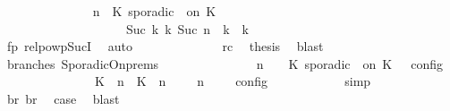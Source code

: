 \begin{isabellebody}
\ \ \ \ \ \ \ \ \ \ \ \ \isamarkupfalse%
\ {\isacartoucheopen}{\isacharparenleft}{\isasymGamma}{\isacharcomma}\ n\ {\isasymturnstile}\ {\isacharparenleft}K\ sporadic\ {\isasymtau}\ on\ K\ {\isacharhash}\ {\isasymPsi}\ {\isasymtriangleright}\ {\isasymPhi}{\isacharparenright}\isanewline
\ \ \ \ \ \ \ \ \ \ \ \ \ \ \ \ \ \ \ \ {\isasymhookrightarrow}\isactrlbsup Suc\ k\isactrlesup \ {\isacharparenleft}{\isasymGamma}\isactrlsub k{\isacharcomma}\ Suc\ n\ {\isasymturnstile}\ {\isasymPsi}\isactrlsub k\ {\isasymtriangleright}\ {\isasymPhi}\isactrlsub k{\isacharparenright}{\isacartoucheclose}\isanewline
\ \ \ \ \ \ \ \ \ \ \ \ \ \ \ \ \isamarkupfalse%
\ fp\ relpowp{\isacharunderscore}Suc{\isacharunderscore}I{}\ \isamarkupfalse%
\ auto\isanewline
\ \ \ \ \ \ \ \ \ \ \ \ \isamarkupfalse%
\ rc\ \isamarkupfalse%
\ {\isacharquery}thesis\ \isamarkupfalse%
\ blast\isanewline
\ \ \ \ \ \ \ \ \isamarkupfalse%
\isanewline
\ \ \ \ \ \ \ \ \isamarkupfalse%
\ branches\ SporadicOn{\isachardot}prems{\isacharparenleft}{}{\isacharparenright}\ \isamarkupfalse%
\isanewline
\ \ \ \ \ \ \ \ \ \ {\isacartoucheopen}{\isasymrho}\ {\isasymin}\ {\isasymlbrakk}\ {\isasymGamma}{\isacharcomma}\ n\ {\isasymturnstile}\ {\isasymPsi}\ {\isasymtriangleright}\ {\isacharparenleft}{\isacharparenleft}K\ sporadic\ {\isasymtau}\ on\ K\ {\isacharhash}\ {\isasymPhi}{\isacharparenright}\ {\isasymrbrakk}\isactrlsub c\isactrlsub o\isactrlsub n\isactrlsub f\isactrlsub i\isactrlsub g\isanewline
\ \ \ \ \ \ \ \ \ \ \ \ \ {\isasymunion}\ {\isasymlbrakk}\ {\isacharparenleft}{\isacharparenleft}K\ {\isasymUp}\ n{\isacharparenright}\ {\isacharhash}\ {\isacharparenleft}K\ {\isasymDown}\ n\ {\isacharat}\ {\isasymtau}{\isacharparenright}\ {\isacharhash}\ {\isasymGamma}{\isacharparenright}{\isacharcomma}\ n\ {\isasymturnstile}\ {\isasymPsi}\ {\isasymtriangleright}\ {\isasymPhi}\ {\isasymrbrakk}\isactrlsub c\isactrlsub o\isactrlsub n\isactrlsub f\isactrlsub i\isactrlsub g{\isacartoucheclose}\isanewline
\ \ \ \ \ \ \ \ \ \ \isamarkupfalse%
\ simp\isanewline
\ \ \ \ \ \ \ \ \isamarkupfalse%
\ br{}\ br{}\ \isamarkupfalse%
\ {\isacharquery}case\ \isamarkupfalse%
\ blast\isanewline

\end{isabellebody}
